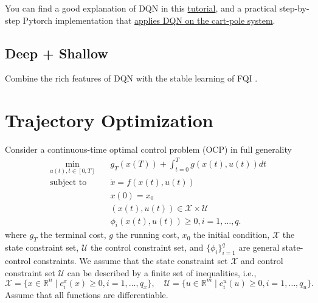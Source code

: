 \documentclass[
]{book}
\theoremstyle{definition}
\theoremstyle{definition}
\theoremstyle{definition}
\theoremstyle{definition}
\theoremstyle{remark}
\begin{document}
You can find a good explanation of DQN in this \href{https://www.tensorflow.org/agents/tutorials/0_intro_rl}{tutorial}, and a practical step-by-step Pytorch implementation that \href{https://pytorch.org/tutorials/intermediate/reinforcement_q_learning.html}{applies DQN on the cart-pole system}.

\hypertarget{deep-shallow}{%
\subsection{Deep + Shallow}\label{deep-shallow}}

Combine the rich features of DQN with the stable learning of FQI \citep{levine17neurips-shallow}.

\hypertarget{trajectory-optimization}{%
\section{Trajectory Optimization}\label{trajectory-optimization}}

Consider a continuous-time optimal control problem (OCP) in full generality
\begin{equation} 
\begin{split}
\min_{u(t), t \in [0,T]} & \quad  g_T(x(T)) + \int_{t = 0}^T g(x(t),u(t)) dt \\
\text{subject to} & \quad \dot{x} = f(x(t),u(t)) \\
& \quad x(0) = x_0 \\
& \quad (x(t),u(t)) \in \mathcal{X} \times \mathcal{U} \\
& \quad \phi_i (x(t),u(t)) \geq 0, i=1,\dots,q.
\end{split}
\label{eq:constrained-optimal-control}
\end{equation}
where \(g_T\) the terminal cost, \(g\) the running cost, \(x_0\) the initial condition, \(\mathcal{X}\) the state constraint set, \(\mathcal{U}\) the control constraint set, and \(\{ \phi_i \}_{i=1}^q\) are general state-control constraints. We assume that the state constraint set \(\mathcal{X}\) and control constraint set \(\mathcal{U}\) can be described by a finite set of inequalities, i.e.,
\[
\mathcal{X} = \{x \in \mathbb{R}^n \mid c^x_i(x) \geq 0, i =1,\dots,q_x\}, \quad \mathcal{U} = \{u \in \mathbb{R}^m \mid c^u_i(u) \geq 0, i = 1,\dots,q_u \}.
\]
Assume that all functions are differentiable.
\end{document}
